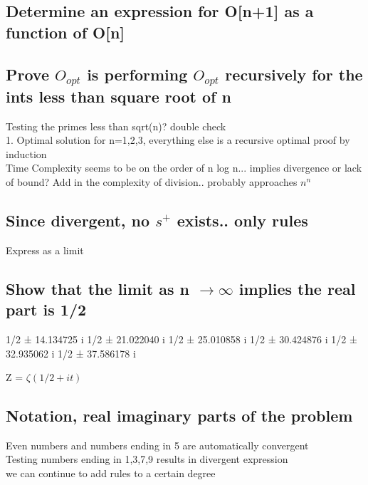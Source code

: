 \documentclass[11pt]{article}
\begin{document}
\subsection{Determine an expression for O[n+1] as a function of O[n]}

\subsection{Prove $O_{opt}$ is performing $O_{opt}$ recursively for the ints less than square root of n}
Testing the primes less than sqrt(n)? double check \\
1. Optimal solution for n=1,2,3, everything else is a recursive optimal proof by induction\\
Time Complexity seems to be on the order of n log n... implies divergence or lack of bound? Add in the complexity of division.. probably approaches $n^n$


\subsection{Since divergent, no $s^{+}$ exists.. only rules}
Express as a limit

\subsection{Show that the limit as n $\rightarrow \infty$ implies the real part is 1/2}
1/2 ± 14.134725 i
1/2 ± 21.022040 i
1/2 ± 25.010858 i
1/2 ± 30.424876 i
1/2 ± 32.935062 i
1/2 ± 37.586178 i

Z = $\zeta(1/2 + it)$

\subsection{Notation, real imaginary parts of the problem}
Even numbers and numbers ending in 5 are automatically convergent\\
Testing numbers ending in 1,3,7,9 results in divergent expression\\
we can continue to add rules to a certain degree
\end{document}

